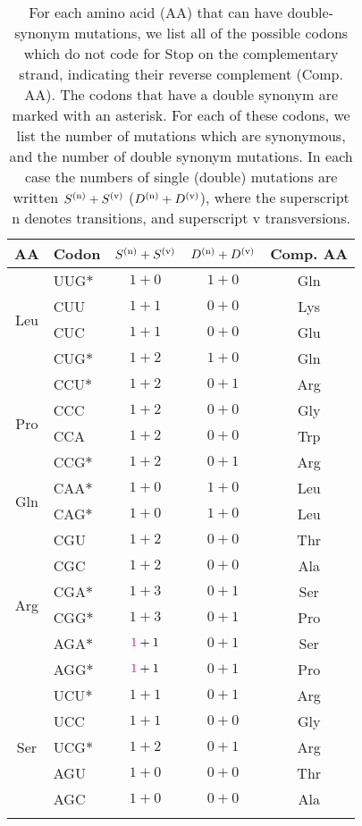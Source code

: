 \documentclass[unnumsec,webpdf,contemporary,large,namedate]{oup-authoring-template}%
\theoremstyle{thmstyleone}%
\theoremstyle{thmstyletwo}%
\theoremstyle{thmstylethree}%
\begin{document}
\begin{table}[t]
\caption{For each amino acid (AA) that can have double-synonym mutations, we list 
all of the possible codons which do not code for Stop on the complementary strand, indicating 
their reverse complement (Comp. AA). 
The codons that have a double synonym are marked with an asterisk. 
For each of these codons, we list the number of mutations which are synonymous, 
and the number of double synonym mutations. In each case the numbers of single (double) mutations are written 
$S^{({\rm n})}+S^{({\rm v})}$ ($D^{({\rm n})}+D^{({\rm v})}$), where the superscript n denotes transitions, 
and superscript v transversions. 
\label{tab: 1}}
\begin{tabular*}{\columnwidth}{@{\extracolsep\fill}clccc@{\extracolsep\fill}}
\toprule
AA&Codon&$S^{({\rm n})}+S^{({\rm v})}$&$D^{({\rm n})}+D^{({\rm v})}$&Comp. AA\\ 
\midrule
\multirow{4}{*}{Leu} &UUG$\ast$&$1+0$&$1+0$&Gln\\ 
       &CUU&$1+1$&$0+0$&Lys\\ 
       &CUC&$1+1$&$0+0$&Glu\\ 
       &CUG$\ast$&$1+2$&$1+0$&Gln\\  
\midrule
\multirow{4}{*}{Pro} &CCU$\ast$&$1+2$&$0+1$&Arg\\ 
       &CCC&$1+2$&$0+0$&Gly\\ 
       &CCA&$1+2$&$0+0$&Trp\\ 
       &CCG$\ast$&$1+2$&$0+1$&Arg\\  
\midrule
\multirow{2}{*}{Gln} &CAA$\ast$&$1+0$&$1+0$&Leu\\ 
       &CAG$\ast$&$1+0$&$1+0$&Leu\\ 
\midrule
\multirow{6}{*}{Arg} &CGU&$1+2$&$0+0$&Thr\\ 
       &CGC&$1+2$&$0+0$&Ala\\ 
       &CGA$\ast$&$1+3$&$0+1$&Ser\\ 
       &CGG$\ast$&$1+3$&$0+1$&Pro\\  
       &AGA$\ast$&${\color{magenta}{1}}+1$&$0+1$&Ser\\ 
       &AGG$\ast$&${\color{magenta}{1}}+1$&$0+1$&Pro\\ 
\midrule
\multirow{5}{*}{Ser} &UCU$\ast$&$1+1$&$0+1$&Arg\\ 
       &UCC&$1+1$&$0+0$&Gly\\ 
       &UCG$\ast$&$1+2$&$0+1$&Arg\\ 
       &AGU&$1+0$&$0+0$&Thr\\  
       &AGC&$1+0$&$0+0$&Ala\\ 
\botrule
\end{tabular*}
\end{table}
\end{document}
